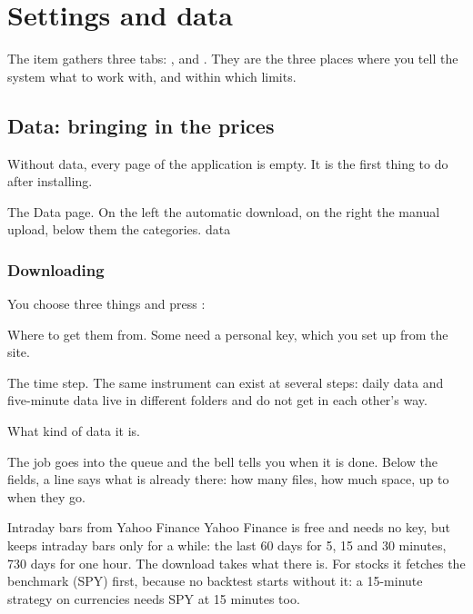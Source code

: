 \chapter{Settings and data}\label{cap:settings}

The  item gathers three tabs: ,  and
. They are the three places where you tell the system
what to work with, and within which limits.

\section{Data: bringing in the prices}\label{sez:data}

Without data, every page of the application is empty. It is the first thing
to do after installing.

  {The Data page. On the left the automatic download, on the right the manual
   upload, below them the categories.}
  {data}

\subsection{Downloading}

You choose three things and press :

\begin{description}[leftmargin = 1.4em, style = nextline, itemsep = 4pt]
  \item[\campo{Provider}] Where to get them from. Some need a personal key,
    which you set up from the site.
  \item[\campo{Timeframe}] The time step. The same instrument can exist at
    several steps: daily data and five-minute data live in different folders
    and do not get in each other's way.
  \item[\campo{Category}] What kind of data it is.
\end{description}

\noindent
The job goes into the queue and the bell tells you when it is done. Below the
fields, a line says what is already there: how many files, how much space, up
to when they go.

\begin{nota}{Intraday bars from Yahoo Finance}
Yahoo Finance is free and needs no key, but keeps intraday bars only for a
while: the last \num{60} days for 5, 15 and 30 minutes, \num{730} days for
one hour. The download takes what there is. For stocks it fetches the
benchmark (SPY) first, because no backtest starts without it: a 15-minute
strategy on currencies needs SPY at 15 minutes too.
\end{nota}


